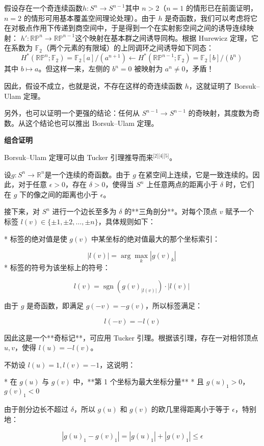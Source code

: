 假设存在一个奇连续函数$h : S^n \to S^{n-1}$其中 $n > 2$（$n=1$ 的情形已在前面证明，$n=2$ 的情形可用基本覆盖空间理论处理）。由于 $h$ 是奇函数，我们可以考虑将它在对极点作用下传递到商空间中，于是得到一个在实射影空间之间的诱导连续映射：
$h' : \mathbb{RP}^n \to \mathbb{RP}^{n-1}$这个映射在基本群之间诱导同构。根据 Hurewicz 定理，它在系数为 $\mathbb{F}_2$（两个元素的有限域）的上同调环之间诱导如下同态：
$$
H^*(\mathbb{RP}^n; \mathbb{F}_2) = \mathbb{F}_2[a]/(a^{n+1}) \leftarrow H^*(\mathbb{RP}^{n-1}; \mathbb{F}_2) = \mathbb{F}_2[b]/(b^n)~
$$
其中 $b \mapsto a$。但这样一来，左侧的 $b^n = 0$ 被映射为 $a^n \neq 0$，矛盾！

因此，假设不成立，也就是说，不存在这样的奇连续函数 $h$，这就证明了 Borsuk–Ulam 定理。

另外，也可以证明一个更强的结论：任何从 $S^{n-1} \to S^{n-1}$ 的奇映射，其度数为奇数。从这个结论也可以推出 Borsuk–Ulam 定理。

\textbf{组合证明}

Borsuk–Ulam 定理可以由 Tucker 引理推导而来\(^\text{[2][4][5]}\)。

设$g : S^n \to \mathbb{R}^n$是一个连续的奇函数。由于 $g$ 在紧空间上连续，它是一致连续的。因此，对于任意 $\epsilon > 0$，存在 $\delta > 0$，使得当 $S^n$ 上任意两点的距离小于 $\delta$ 时，它们在 $g$ 下的像之间的距离也小于 $\epsilon$。

接下来，对 $S^n$ 进行一个边长至多为 $\delta$ 的**三角剖分**。对每个顶点 $v$ 赋予一个标签 $l(v) \in \{\pm 1, \pm 2, \dots, \pm n\}$，具体规则如下：

* 标签的绝对值是使 $g(v)$ 中某坐标的绝对值最大的那个坐标索引：

  $$
  |l(v)| = \arg \max_k |g(v)_k|~
  $$
* 标签的符号为该坐标上的符号：

  $$
  l(v) = \operatorname{sgn}(g(v)_{|l(v)|}) \cdot |l(v)|~
  $$

由于 $g$ 是奇函数，即满足 $g(-v) = -g(v)$，所以标签满足：

$$
l(-v) = -l(v)
$$

因此这是一个**奇标记**，可应用 Tucker 引理。根据该引理，存在一对相邻顶点 $u, v$，使得 $l(u) = -l(v)$。

不妨设 $l(u) = 1, l(v) = -1$，这说明：

* 在 $g(u)$ 与 $g(v)$ 中，**第 1 个坐标为最大坐标分量**
* 且 $g(u)_1 > 0$，$g(v)_1 < 0$

由于剖分边长不超过 $\delta$，所以 $g(u)$ 和 $g(v)$ 的欧几里得距离小于等于 $\epsilon$，特别地：

$$
|g(u)_1 - g(v)_1| = |g(u)_1| + |g(v)_1| \leq \epsilon
$$

